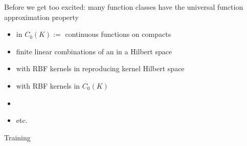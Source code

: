 \begin{frame}
    
    Before we get too excited: many function classes have the universal function
    approximation property

            \vspace{0.4em}
    \begin{itemize}
        \item {} in $C_0(K) :=$ continuous functions on compacts 
            \vspace{0.4em}
        \item finite linear combinations of an  in a Hilbert space
            \vspace{0.4em}
        \item {} with RBF kernels in reproducing kernel Hilbert space
            \vspace{0.4em}
        \item {} with RBF kernels in $C_0(K)$
            \vspace{0.4em}
        \item {}
            \vspace{0.4em}
        \item etc.
    \end{itemize}

\end{frame}



\begin{frame}{Training}
    
    \begin{figure}
       \centering
    \end{figure}

\end{frame}


